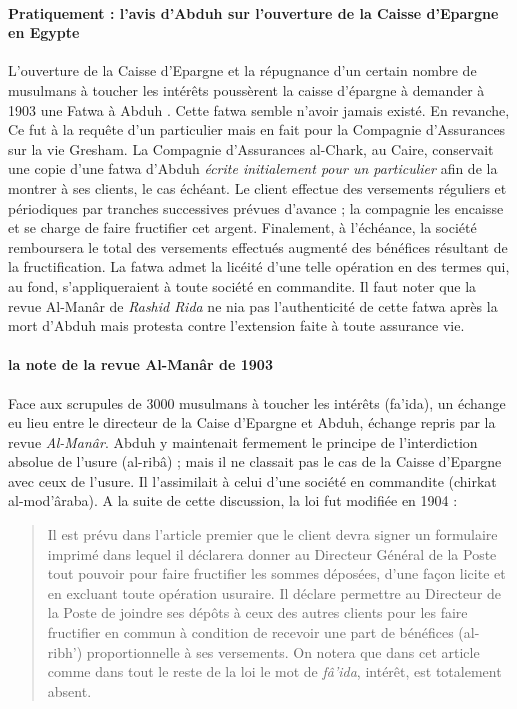 \paragraph{Pratiquement : l'avis d'Abduh sur l'ouverture de la Caisse d'Epargne en Egypte}
L'ouverture de la Caisse d'Epargne et la répugnance d'un certain nombre de musulmans à toucher les intérêts poussèrent la caisse d'épargne à demander à 1903 une Fatwa à Abduh \cite{Jomier:AdbouCaisseEpargne}. Cette fatwa semble n'avoir jamais existé. En revanche, Ce fut à la requête d'un particulier mais en fait pour la
Compagnie d'Assurances sur la vie Gresham. La Compagnie d'Assurances al-Chark,
au Caire,  conservait une copie d'une fatwa d'Abduh \textit{écrite initialement pour un particulier} afin de la montrer à ses clients, le cas échéant. Le
client effectue des versements réguliers et périodiques par tranches successives
prévues d'avance ; la compagnie les encaisse et se charge de faire fructifier cet
argent. Finalement, à l'échéance, la société remboursera le total des versements
effectués augmenté des bénéfices résultant de la fructification. La fatwa admet
la licéité d'une telle opération en des termes qui, au fond, s'appliqueraient à toute
société en commandite. Il faut noter que la revue Al-Manâr de \textit{Rashid Rida} ne nia pas l'authenticité de cette fatwa après la mort d'Abduh mais protesta contre l'extension faite à toute assurance vie.

\paragraph{la note de la revue Al-Manâr de 1903}


Face aux scrupules de 3000 musulmans à toucher les intérêts (fa'ida), un échange eu lieu entre le directeur de la Caise d'Epargne et Abduh, échange repris par la revue \textit{Al-Manâr}. Abduh y maintenait fermement le principe de
l'interdiction absolue de l'usure (al-ribâ) ; mais il ne classait pas le cas de la Caisse
d'Epargne avec ceux de l'usure. Il l'assimilait à celui d'une société en commandite
(chirkat al-mod'âraba). A la suite de cette discussion, la loi fut modifiée en 1904 : 
 

\begin{quote}
 Il est prévu dans l'article premier que le client devra signer un
formulaire imprimé dans lequel il déclarera donner au Directeur Général de la
Poste tout pouvoir pour faire fructifier les sommes déposées, d'une façon licite et
en excluant toute opération usuraire. Il déclare permettre au Directeur de la Poste
de joindre ses dépôts à ceux des autres clients pour les faire fructifier en commun
à condition de recevoir une part de bénéfices (al-ribh') proportionnelle à ses
versements. On notera que dans cet article comme dans tout le reste de la loi le
mot de \textit{fâ'ida}, intérêt, est totalement absent. \cite{Jomier:AdbouCaisseEpargne}
\end{quote}


